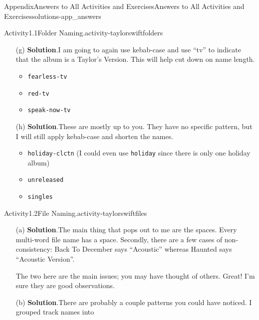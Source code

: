 \documentclass[oneside,10pt,]{book}
\newcommand{\blocktitlefont}{\relax}
\newcommand{\mono}[1]{\texttt{#1}}
\begin{document}
\begin{solutions-chapter}{Appendix}{Answers to All Activities and Exercises}{}{Answers to All Activities and Exercises}{}{}{solutions-app_answers}
\begin{activitysolution}{Activity}{1.1}{Folder Naming.}{activity-taylorswiftfolders}
\begin{enumerate}[font=\bfseries,label=(\alph*),ref=\alph*]
\begin{itemize}[label=\textbullet]
\item{}\mono{clear-chnl-live}%
\item{}\mono{speak-now-live}%
\end{itemize}
%
\item[(g)]\noindent\textbf{\blocktitlefont Solution}.\hypertarget{solution-taylorswiftfolders-j-b-back}{}\quad{}I am going to again use kebab-case and use ``tv'' to indicate that the album is a Taylor's Version. This will help cut down on name length.%
\begin{itemize}[label=\textbullet]
\item{}\mono{fearless-tv}%
\item{}\mono{red-tv}%
\item{}\mono{speak-now-tv}%
\end{itemize}
%
\item[(h)]\noindent\textbf{\blocktitlefont Solution}.\hypertarget{solution-taylorswiftfolders-k-b-back}{}\quad{}These are mostly up to you. They have no specific pattern, but I will still apply kebab-case and shorten the names.%
\begin{itemize}[label=\textbullet]
\item{}\mono{holiday-clctn} (I could even use \mono{holiday} since there is only one holiday album)%
\item{}\mono{unreleased}%
\item{}\mono{singles}%
\end{itemize}
%
\end{enumerate}%
\end{activitysolution}%
\begin{activitysolution}{Activity}{1.2}{File Naming.}{activity-taylorswiftfiles}%
\begin{enumerate}[font=\bfseries,label=(\alph*),ref=\alph*]%
\item[(a)]\noindent\textbf{\blocktitlefont Solution}.\hypertarget{solution-taylorswiftfiles-d-b-back}{}\quad{}The main thing that pops out to me are the spaces. Every multi-word file name has a space. Secondly, there are a few cases of non-consistency: Back To December says ``Acoustic'' whereas Haunted says ``Acoustic Version''.%
\par
The two here are the main issues; you may have thought of others. Great! I'm sure they are good observations.%
\item[(b)]\noindent\textbf{\blocktitlefont Solution}.\hypertarget{solution-taylorswiftgroups2-b-back}{}\quad{}There are probably a couple patterns you could have noticed. I grouped track names into%

\end{enumerate}
\end{activitysolution}
\end{solutions-chapter}
\end{document}
